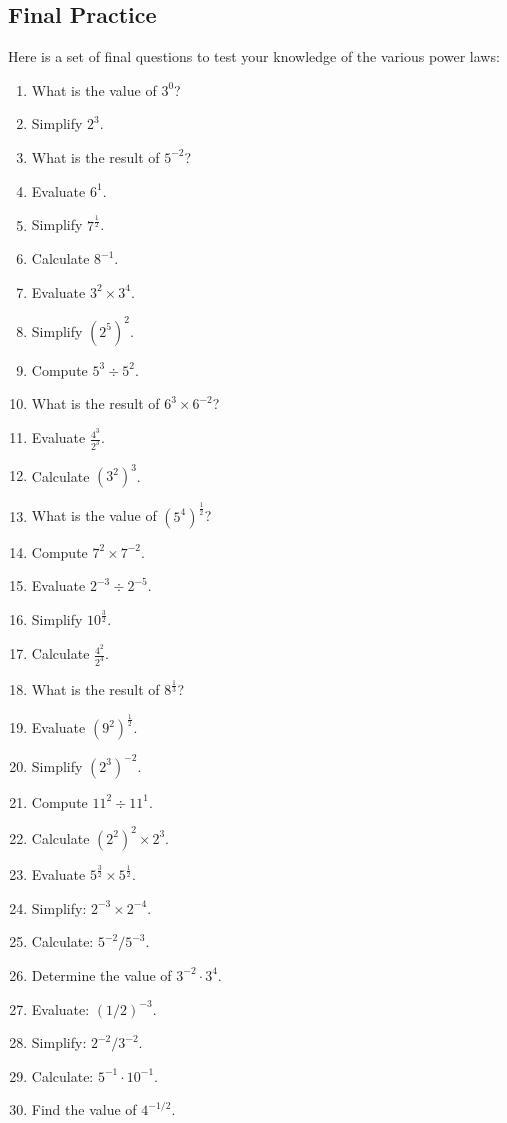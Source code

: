 \documentclass{article}
\begin{document}
\subsection*{Final Practice}
Here is a set of final questions to test your knowledge of the various power laws:\\
\begin{enumerate}
\item What is the value of $3^0$?
\item Simplify $2^3$.
\item What is the result of $5^{-2}$?
\item Evaluate $6^1$.
\item Simplify $7^{\frac{1}{2}}$.
\item Calculate $8^{-1}$.
\item Evaluate $3^2 \times 3^4$.
\item Simplify $(2^5)^2$.
\item Compute $5^3 \div 5^2$.
\item What is the result of $6^3 \times 6^{-2}$?
\item Evaluate $\frac{4^3}{2^3}$.
\item Calculate $(3^2)^3$.
\item What is the value of $(5^4)^{\frac{1}{2}}$?
\item Compute $7^2 \times 7^{-2}$.
\item Evaluate $2^{-3} \div 2^{-5}$.
\item Simplify $10^{\frac{3}{2}}$.
\item Calculate $\frac{4^2}{2^4}$.
\item What is the result of $8^{\frac{1}{3}}$?
\item Evaluate $(9^2)^{\frac{1}{2}}$.
\item Simplify $(2^3)^{-2}$.
\item Compute $11^2 \div 11^1$.
\item Calculate $(2^2)^2 \times 2^3$.
\item Evaluate $5^{\frac{3}{2}} \times 5^{\frac{1}{2}}$.
\item Simplify: $2^{-3} \times 2^{-4}$.
\item Calculate: $5^{-2} / 5^{-3}$.
\item Determine the value of $3^{-2} \cdot 3^4$.
\item Evaluate: $(1/2)^{-3}$.
\item Simplify: $2^{-2}/3^{-2}$.
\item Calculate: $5^{-1} \cdot 10^{-1}$.
\item Find the value of $4^{-1/2}$.

\end{enumerate}
\end{document}

